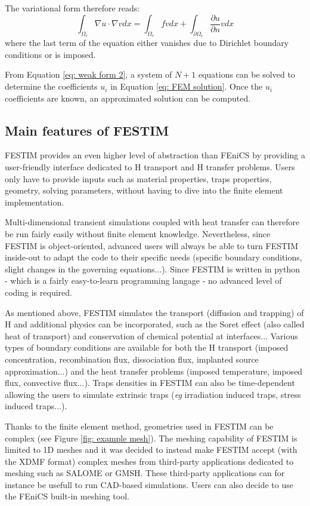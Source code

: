 The variational form therefore reads:
\begin{equation}
    \int_{\Omega_e} \nabla u \cdot \nabla v dx = \int_{\Omega_e} f v dx + \int_{\partial \Omega_e} \frac{\partial u}{\partial n} v dx
    \label{eq: weak form 2}
\end{equation}
where the last term of the equation either vanishes due to Dirichlet boundary conditions or is imposed.

From Equation \ref{eq: weak form 2}, a system of $N+1$ equations can be solved to determine the coefficients $u_i$ in Equation \ref{eq: FEM solution}.
Once the $u_i$ coefficients are known, an approximated solution can be computed.

\subsection{Main features of FESTIM}
FESTIM provides an even higher level of abstraction than FEniCS by providing a user-friendly interface dedicated to H transport and H transfer problems.
Users only have to provide inputs such as material properties, traps properties, geometry, solving parameters, without having to dive into the finite element implementation.

Multi-dimensional transient simulations coupled with heat transfer can therefore be run fairly easily without finite element knowledge.
Nevertheless, since FESTIM is object-oriented, advanced users will always be able to turn FESTIM inside-out to adapt the code to their specific needs (specific boundary conditions, slight changes in the governing equations...).
Since FESTIM is written in python - which is a fairly easy-to-learn programming langage - no advanced level of coding is required.

As mentioned above, FESTIM simulates the transport (diffusion and trapping) of H and additional physics can be incorporated, such as the Soret effect (also called heat of transport) and conservation of chemical potential at interfaces...
Various types of boundary conditions are available for both the H transport (imposed concentration, recombination flux, dissociation flux, implanted source approximation...) and the heat transfer problems (imposed temperature, imposed flux, convective flux...).
Traps densities in FESTIM can also be time-dependent allowing the users to simulate extrinsic traps (\textit{eg} irradiation induced traps, stress induced traps...).

Thanks to the finite element method, geometries used in FESTIM can be complex (see Figure \ref{fig: example mesh}).
The meshing capability of FESTIM is limited to 1D meshes and it was decided to instead make FESTIM accept (with the XDMF format) complex meshes from third-party applications dedicated to meshing such as SALOME or GMSH.
These third-party applications can for instance be usefull to run CAD-based simulations.
Users can also decide to use the FEniCS built-in meshing tool.

